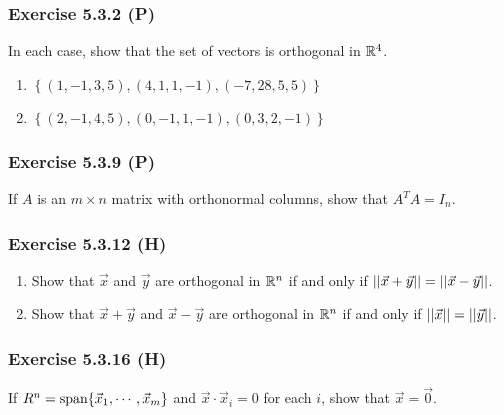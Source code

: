 \documentclass[pdf,9pt,t]{beamer}
\begin{document}
\begin{frame}[fragile]
    \frametitle{Exercise 5.3.2 (P)}
    \begin{problem}
	In each case, show that the set of vectors is orthogonal in $\mathbb{R}^4$.
	\begin{enumerate}
	    \item $\left\{(1,-1,3,5),(4,1,1,-1),(-7,28,5,5)\right\}$
	    \item $\left\{(2,-1,4,5),(0,-1,1,-1),(0,3,2,-1)\right\}$
	\end{enumerate}
    \end{problem}

\end{frame}
\begin{frame}[fragile]
    \frametitle{Exercise 5.3.9  (P)}
    \begin{problem}
	If $A$ is an $m \times n$ matrix with orthonormal columns, show that $A^TA=I_n$.
    \end{problem}

\end{frame}
\begin{frame}[fragile]
    \frametitle{Exercise 5.3.12 (H)}
    \begin{problem}
	\begin{enumerate}
	    \item Show that $\vec{x}$ and $\vec{y}$ are orthogonal in $\mathbb{R}^n$ if and only if $\left|\left| \vec{x}+\vec{y} \right|\right|=\left|\left| \vec{x}-\vec{y} \right|\right|$.
	    \item Show that $\vec{x}+\vec{y}$ and $\vec{x}-\vec{y}$ are orthogonal in $\mathbb{R}^n$ if and only if $\left|\left| \vec{x} \right|\right|=\left|\left| \vec{y} \right|\right|$.
	\end{enumerate}
    \end{problem}

\end{frame}
\begin{frame}[fragile]
    \frametitle{Exercise 5.3.16 (H)}
    \begin{problem}
	If $R^n=\mbox{span}\{\vec{x}_1,\cdots,\vec{x}_m\}$ and $\vec{x}\cdot \vec{x}_i=0$ for each $i$, show that $\vec{x}=\vec{0}$.
    \end{problem}

\end{frame}
\end{document}
